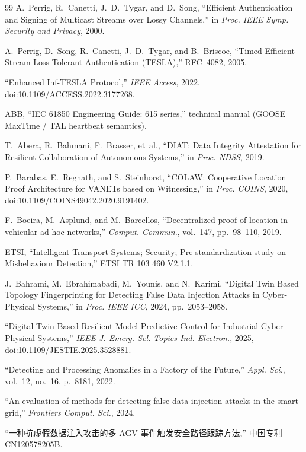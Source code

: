 \documentclass[manuscript,screen,review]{acmart}
\begin{document}
\begin{thebibliography}{99}
A.~Perrig, R.~Canetti, J.~D.~Tygar, and D.~Song,
``Efficient Authentication and Signing of Multicast Streams over Lossy Channels,''
in \textit{Proc. IEEE Symp. Security and Privacy}, 2000.

A.~Perrig, D.~Song, R.~Canetti, J.~D.~Tygar, and B.~Briscoe,
``Timed Efficient Stream Loss-Tolerant Authentication (TESLA),''
RFC~4082, 2005.

``Enhanced Inf-TESLA Protocol,''
\textit{IEEE Access}, 2022, doi:10.1109/ACCESS.2022.3177268.

ABB,
``IEC 61850 Engineering Guide: 615 series,''
technical manual (GOOSE MaxTime / TAL heartbeat semantics).

T.~Abera, R.~Bahmani, F.~Brasser, et~al.,
``DIAT: Data Integrity Attestation for Resilient Collaboration of Autonomous Systems,''
in \textit{Proc. NDSS}, 2019.

P.~Barabas, E.~Regnath, and S.~Steinhorst,
``COLAW: Cooperative Location Proof Architecture for VANETs based on Witnessing,''
in \textit{Proc. COINS}, 2020, doi:10.1109/COINS49042.2020.9191402.

F.~Boeira, M.~Asplund, and M.~Barcellos,
``Decentralized proof of location in vehicular ad hoc networks,''
\textit{Comput. Commun.}, vol.~147, pp.~98--110, 2019.

ETSI,
``Intelligent Transport Systems; Security; Pre-standardization study on Misbehaviour Detection,''
ETSI TR 103 460 V2.1.1.

J.~Bahrami, M.~Ebrahimabadi, M.~Younis, and N.~Karimi,
``Digital Twin Based Topology Fingerprinting for Detecting False Data Injection Attacks in Cyber-Physical Systems,''
in \textit{Proc. IEEE ICC}, 2024, pp.~2053--2058.

``Digital Twin-Based Resilient Model Predictive Control for Industrial Cyber-Physical Systems,''
\textit{IEEE J. Emerg. Sel. Topics Ind. Electron.}, 2025, doi:10.1109/JESTIE.2025.3528881.

``Detecting and Processing Anomalies in a Factory of the Future,''
\textit{Appl. Sci.}, vol.~12, no.~16, p.~8181, 2022.

``An evaluation of methods for detecting false data injection attacks in the smart grid,''
\textit{Frontiers Comput. Sci.}, 2024.

``一种抗虚假数据注入攻击的多 AGV 事件触发安全路径跟踪方法,''
中国专利 CN120578205B.


\end{thebibliography}
\end{document}
